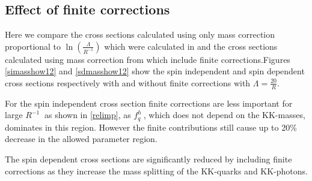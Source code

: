 \documentclass{article}
\begin{document}
\subsection{Effect of finite corrections}
Here we compare the cross sections calculated using only mass correction proportional to $\ln(\frac{\Lambda}{R^{-1}})$ which were calculated in \cite{oldcorrections} and the cross sections calculated using mass correction from \cite{freitas2018radiative} which include finite corrections.Figures \ref{simasshow12} and \ref{sdmasshow12} show the spin independent and spin dependent cross sections respectively with and without finite corrections with $\Lambda=\frac{20}{R}$. 

For the spin independent cross section  finite corrections are less important for large $R^{-1} \ $ as shown in \ref{relimp}, as $f_q^h \ $, which does not depend on the KK-masses, dominates in this region. However the finite contributions still cause up to 20\% decrease in the allowed parameter region.

The spin dependent cross sections are significantly reduced by including finite corrections as they increase the mass splitting of the KK-quarks and KK-photons.  
\end{document}
